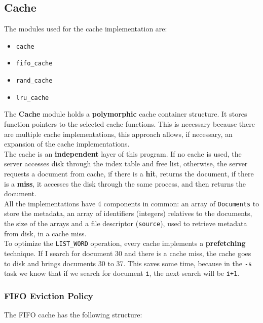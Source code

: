 \documentclass[a4paper, 11pt]{article}
\begin{document}
\subsection{Cache}

The modules used for the cache implementation are:

\begin{itemize}
    \item \texttt{cache}
    \item \texttt{fifo\_cache}
    \item \texttt{rand\_cache}
    \item \texttt{lru\_cache}
\end{itemize}

\noindent The \textbf{Cache} module holds a \textbf{polymorphic} cache container structure. It stores function pointers to the selected cache functions. This is necessary because there are multiple cache implementations, this approach allows, if necessary, an expansion of the cache implementations.\\

\noindent The cache is an \textbf{independent} layer of this program. If no cache is used, the server accesses disk through the index table and free list, otherwise, the server requests a document from cache, if there is a \textbf{hit}, returns the document, if there is a \textbf{miss}, it accesses the disk through the same process, and then returns the document.\\

\noindent All the implementations have 4 components in common: an array of \texttt{Documents} to store the metadata, an array of identifiers (integers) relatives to the documents, the size of the arrays and a file descriptor (\texttt{source}), used to retrieve metadata from disk, in a cache miss.\\

\noindent To optimize the \texttt{LIST\_WORD} operation, every cache implements a \textbf{prefetching} technique. If I search for document 30 and there is a cache miss, the cache goes to disk and brings documents 30 to 37. This saves some time, because in the \texttt{-s} task we know that if we search for document \texttt{i}, the next search will be \texttt{i+1}.

\subsubsection{FIFO Eviction Policy}

The FIFO cache has the following structure:
\end{document}

